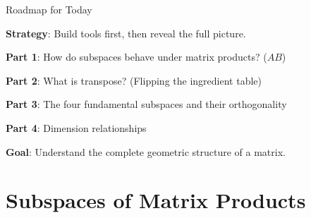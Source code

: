\documentclass[10pt]{beamer}
\theoremstyle{definition}
\newcommand{\x}[1]{\alert{\textbf{#1}}}
\begin{document}
\begin{frame}{Roadmap for Today}

\x{Strategy}: Build tools first, then reveal the full picture.

\vspace{1em}

\textbf{Part 1}: How do subspaces behave under matrix products? ($AB$)

\vspace{0.5em}

\textbf{Part 2}: What is transpose? (Flipping the ingredient table)

\vspace{0.5em}

\textbf{Part 3}: The four fundamental subspaces and their orthogonality

\vspace{0.5em}

\textbf{Part 4}: Dimension relationships

\vspace{1em}

\x{Goal}: Understand the complete geometric structure of a matrix.

\end{frame}

\section{Subspaces of Matrix Products}
\end{document}
